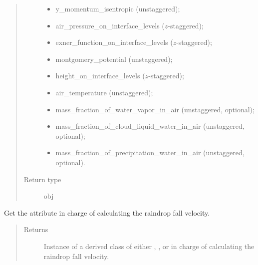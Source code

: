 \documentclass[letterpaper,10pt,english]{sphinxmanual}
\begin{document}
\begin{fulllineitems}
\begin{fulllineitems}
\begin{quote}
\begin{description}
\begin{itemize}
\item {} 
y\_momentum\_isentropic (unstaggered);

\item {} 
air\_pressure\_on\_interface\_levels (\(z\)-staggered);

\item {} 
exner\_function\_on\_interface\_levels (\(z\)-staggered);

\item {} 
montgomery\_potential (unstaggered);

\item {} 
height\_on\_interface\_levels (\(z\)-staggered);

\item {} 
air\_temperature (unstaggered);

\item {} 
mass\_fraction\_of\_water\_vapor\_in\_air (unstaggered, optional);

\item {} 
mass\_fraction\_of\_cloud\_liquid\_water\_in\_air (unstaggered, optional);

\item {} 
mass\_fraction\_of\_precipitation\_water\_in\_air (unstaggered, optional).

\end{itemize}


\item[{Return type}] \leavevmode
obj

\end{description}\end{quote}

\end{fulllineitems}


\begin{fulllineitems}
\label{\detokenize{api:tasmania.dycore.dycore_isentropic.DynamicalCoreIsentropic.microphysics}}
Get the attribute in charge of calculating the raindrop fall velocity.
\begin{quote}\begin{description}
\item[{Returns}] \leavevmode
Instance of a derived class of either
{\hyperref[\detokenize{api:tasmania.parameterizations.slow_tendencies.SlowTendencyMicrophysics}]{}},
,
or {\hyperref[\detokenize{api:tasmania.parameterizations.adjustments.AdjustmentMicrophysics}]{}} in
charge of calculating the raindrop fall velocity.


\end{description}
\end{quote}
\end{fulllineitems}
\end{fulllineitems}
\end{document}
